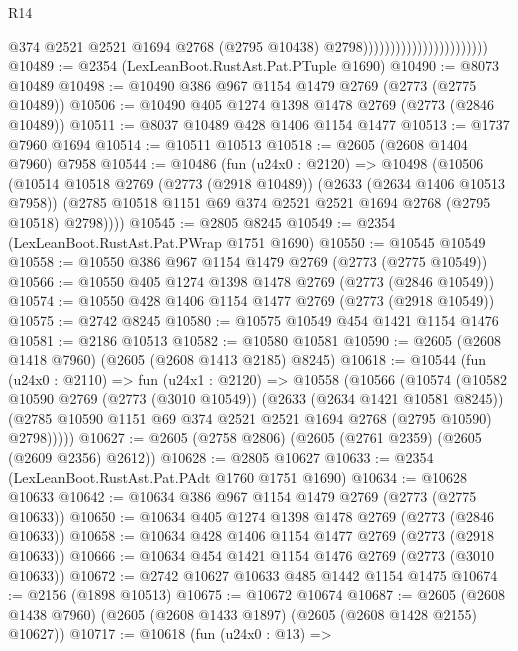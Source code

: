 \begin{lexlean}{R14}
\begin{coremodule}
                                                  @374
                                                  @2521
                                                  @2521
                                                  @1694
                                                  @2768
                                                  (@2795 @10438)
                                                  @2798)))))))))))))))))))))))
@10489 := @2354 (LexLeanBoot.RustAst.Pat.PTuple @1690)
@10490 := @8073 @10489
@10498 := @10490 @386 @967 @1154 @1479 @2769 (@2773 (@2775 @10489))
@10506 := @10490 @405 @1274 @1398 @1478 @2769 (@2773 (@2846 @10489))
@10511 := @8037 @10489 @428 @1406 @1154 @1477
@10513 := @1737 @7960 @1694
@10514 := @10511 @10513
@10518 := @2605 (@2608 @1404 @7960) @7958
@10544 := @10486
    (fun (u24x0 : @2120) =>
    @10498
      (@10506
        (@10514
          @10518
          @2769
          (@2773 (@2918 @10489))
          (@2633 (@2634 @1406 @10513 @7958))
          (@2785 @10518 @1151 @69 @374 @2521 @2521 @1694 @2768 (@2795 @10518) @2798))))
@10545 := @2805 @8245
@10549 := @2354 (LexLeanBoot.RustAst.Pat.PWrap @1751 @1690)
@10550 := @10545 @10549
@10558 := @10550 @386 @967 @1154 @1479 @2769 (@2773 (@2775 @10549))
@10566 := @10550 @405 @1274 @1398 @1478 @2769 (@2773 (@2846 @10549))
@10574 := @10550 @428 @1406 @1154 @1477 @2769 (@2773 (@2918 @10549))
@10575 := @2742 @8245
@10580 := @10575 @10549 @454 @1421 @1154 @1476
@10581 := @2186 @10513
@10582 := @10580 @10581
@10590 := @2605 (@2608 @1418 @7960) (@2605 (@2608 @1413 @2185) @8245)
@10618 := @10544
    (fun (u24x0 : @2110) =>
    fun (u24x1 : @2120) =>
    @10558
      (@10566
        (@10574
          (@10582
            @10590
            @2769
            (@2773 (@3010 @10549))
            (@2633 (@2634 @1421 @10581 @8245))
            (@2785 @10590 @1151 @69 @374 @2521 @2521 @1694 @2768 (@2795 @10590) @2798)))))
@10627 := @2605 (@2758 @2806) (@2605 (@2761 @2359) (@2605 (@2609 @2356) @2612))
@10628 := @2805 @10627
@10633 := @2354 (LexLeanBoot.RustAst.Pat.PAdt @1760 @1751 @1690)
@10634 := @10628 @10633
@10642 := @10634 @386 @967 @1154 @1479 @2769 (@2773 (@2775 @10633))
@10650 := @10634 @405 @1274 @1398 @1478 @2769 (@2773 (@2846 @10633))
@10658 := @10634 @428 @1406 @1154 @1477 @2769 (@2773 (@2918 @10633))
@10666 := @10634 @454 @1421 @1154 @1476 @2769 (@2773 (@3010 @10633))
@10672 := @2742 @10627 @10633 @485 @1442 @1154 @1475
@10674 := @2156 (@1898 @10513)
@10675 := @10672 @10674
@10687 := @2605 (@2608 @1438 @7960) (@2605 (@2608 @1433 @1897) (@2605 (@2608 @1428 @2155) @10627))
@10717 := @10618
    (fun (u24x0 : @13) =>

\end{coremodule}
\end{lexlean}

